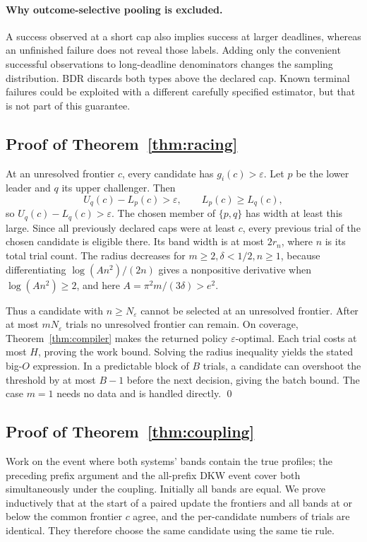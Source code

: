 \documentclass[11pt]{article}
\theoremstyle{definition}\newtheorem{definition}[theorem]{Definition}
\newcommand{\eps}{\varepsilon}
\begin{document}
\paragraph{Why outcome-selective pooling is excluded.} A success observed at a short cap also implies success at larger deadlines, whereas an unfinished failure does not reveal those labels. Adding only the convenient successful observations to long-deadline denominators changes the sampling distribution. BDR discards both types above the declared cap. Known terminal failures could be exploited with a different carefully specified estimator, but that is not part of this guarantee.

\subsection{Proof of Theorem~\ref{thm:racing}}
At an unresolved frontier $c$, every candidate has $g_i(c)>\eps$. Let $p$ be the lower leader and $q$ its upper challenger. Then
\[
 U_q(c)-L_p(c)>\eps,
 \qquad L_p(c)\ge L_q(c),
\]
so $U_q(c)-L_q(c)>\eps$. The chosen member of $\{p,q\}$ has width at least this large. Since all previously declared caps were at least $c$, every previous trial of the chosen candidate is eligible there. Its band width is at most $2r_n$, where $n$ is its total trial count. The radius decreases for $m\ge2,\delta<1/2,n\ge1$, because differentiating $\log(An^2)/(2n)$ gives a nonpositive derivative when $\log(An^2)\ge2$, and here $A=\pi^2m/(3\delta)>e^2$.

Thus a candidate with $n\ge N_\eps$ cannot be selected at an unresolved frontier. After at most $mN_\eps$ trials no unresolved frontier can remain. On coverage, Theorem~\ref{thm:compiler} makes the returned policy $\eps$-optimal. Each trial costs at most $H$, proving the work bound. Solving the radius inequality yields the stated big-$O$ expression. In a predictable block of $B$ trials, a candidate can overshoot the threshold by at most $B-1$ before the next decision, giving the batch bound. The case $m=1$ needs no data and is handled directly. \qed

\subsection{Proof of Theorem~\ref{thm:coupling}}
Work on the event where both systems' bands contain the true profiles; the preceding prefix argument and the all-prefix DKW event cover both simultaneously under the coupling. Initially all bands are equal. We prove inductively that at the start of a paired update the frontiers and all bands at or below the common frontier $c$ agree, and the per-candidate numbers of trials are identical. They therefore choose the same candidate using the same tie rule.
\end{document}

